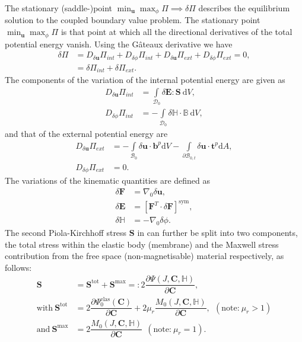 \documentclass[11pt,a4paper,final]{article}
\begin{document}
The stationary (saddle-)point $\min_{\mathbf{u}} \max_{\phi} \Pi \implies \delta \Pi$ describes the equilibrium solution to the coupled boundary value problem. The stationary point $\min_{\mathbf{u}} \max_{\phi} \Pi$ is that point at which all the directional derivatives of the total potential energy vanish. Using the G\^ateaux derivative we have
\begin{align}
\delta \Pi &= D_{\delta \mathbf{u}} \Pi_{int} + D_{\delta \phi} \Pi_{int} + D_{\delta \mathbf{u}} \Pi_{ext} + D_{\delta \phi} \Pi_{ext} = 0, \label{eq:3.25} \\
&= \delta \Pi_{int} + \delta \Pi_{ext}. \nonumber
\end{align}
The components of the variation of the internal potential energy are given as \cite{Saxena2015}
\begin{align}
D_{\delta \mathbf{u}} \Pi_{int} &= \int\limits_{\mathcal{D}_0} \delta \mathbf{E} : \mathbf{S} \ \mathrm{d}V, \label{eq:3.26.1}\\
D_{\delta \phi} \Pi_{int} &= -\int\limits_{\mathcal{D}_0} \delta \mathbb{H} \cdot \mathbb{B} \ \mathrm{d}V,
\label{eq:3.26.2}
\end{align}
and that of the external potential energy are
\begin{align}
D_{\delta \mathbf{u}} \Pi_{ext} &= -\int\limits_{\mathcal{B}_0} \delta \mathbf{u} \cdot \mathbf{b}^p \mathrm{d}V - \int\limits_{\partial \mathcal{B}_{0,t}} \delta \mathbf{u} \cdot \mathbf{t}^p \mathrm{d}A, \label{eq:3.27.1}\\
D_{\delta \phi} \Pi_{ext} &= 0.
\label{eq:3.27.2}
\end{align}
The variations of the kinematic quantities are defined as 
\begin{align}
\delta \mathbf{F} &= \nabla_0 \delta \mathbf{u}, \\
\delta \mathbf{E} &= \left[ \mathbf{F}^T \cdot \delta \mathbf{F} \right]^{\text{sym}}, \\ 
\delta \mathbb{H} &= -\nabla_0 \delta \phi.
\label{eq:3.28}
\end{align}
The second Piola-Kirchhoff stress $\mathbf{S}$ in  can further be split into two components, the total stress within the elastic body (membrane) and the Maxwell stress contribution from the free space (non-magnetisable) material respectively, as follows:
\begin{align}
\mathbf{S} &= \mathbf{S}^{\text{tot}} + \mathbf{S}^{\text{max}} =: 2 \dfrac{\partial \Psi (J, \mathbf{C}, \mathbb{H})}{\partial \mathbf{C}}, \\
\text{with} \ \mathbf{S}^{\text{tot}} &= 2 \dfrac{\partial \Psi_0^{\text{elas}} (\mathbf{C})}{\partial \mathbf{C}} + 2 \mu_r \dfrac{M_0 (J, \mathbf{C}, \mathbb{H})}{\partial \mathbf{C}}, \ \ (\text{note:} \ \mu_r > 1)\\
\text{and} \ \mathbf{S}^{\text{max}} &= 2 \dfrac{M_0 (J, \mathbf{C}, \mathbb{H})}{\partial \mathbf{C}}  \ \ (\text{note:} \ \mu_r = 1).
\end{align}
\end{document}
